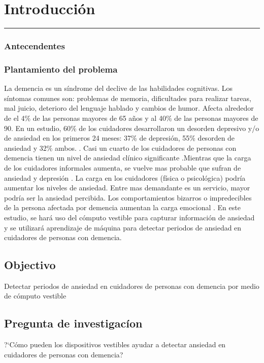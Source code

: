 
\chapter{Introducci\'on}\label{capit:cap1}
\vspace{-2.0325ex}%
\noindent
\rule{\textwidth}{0.5pt}
\vspace{-5.5ex}%
\newcommand{\pushline}{\Indp}

\subsection{Antecendentes}
\subsection{Plantamiento del problema}
	La demencia es un s\'indrome del declive de las habilidades cognitivas. Los s\'intomas comunes son: problemas de memoria, dificultades para realizar tareas, mal juicio, deterioro del lenguaje hablado y cambios de humor\citep{Aziz}. Afecta alrededor de el 4\% de las personas mayores de 65 a\~nos y al 40\% de las personas mayores de 90.
	        En un estudio, 60\% de los cuidadores desarrollaron un desorden depresivo y/o de ansiedad en los primeros 24 meses: 37\% de depresi\'on, 55\% desorden de ansiedad y 32\% ambos. \citep{Joling2014}. Casi un cuarto de los cuidadores de personas con demencia tienen un nivel de ansiedad cl\'inico significante \citep{Cooper200615}.Mientras que la carga de los cuidadores informales aumenta, se vuelve mas probable que sufran de ansiedad y depresi\'on \citep{Denno20131731}. La carga en los cuidadores (f\'isica o psicol\'ogica) podr\'ia aumentar los niveles de ansiedad. Entre mas demandante es un servicio, mayor podr\'ia ser la ansiedad percibida. Los comportamientos bizarros o impredecibles de la persona afectada por demencia aumentan la carga emocional \citep{Rosa201054}. En este estudio, se har\'a uso del c\'omputo vestible para capturar informaci\'on de ansiedad y se utilizar\'a aprendizaje de m\'aquina para detectar periodos de ansiedad en cuidadores de personas con demencia.

\section{Objectivo}
	Detectar periodos de ansiedad en cuidadores de personas con demencia por medio de c\'omputo vestible
\section{Pregunta de investigac\'ion}
	?`C\'omo pueden los dispositivos vestibles ayudar a detectar ansiedad en cuidadores de personas con demencia?
